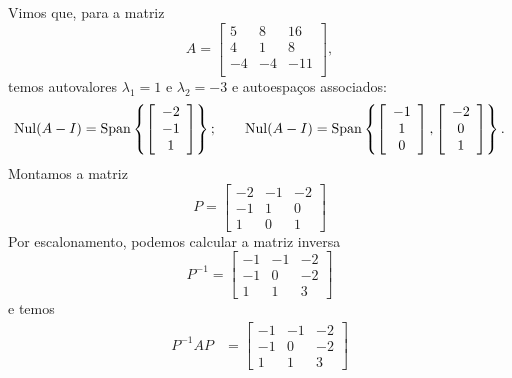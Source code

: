 \begin{ex}\label{exp:3x3denovo}
	Vimos que, para a matriz
	\begin{equation}
	A =
	\left[
	\begin{array}{ccc}
	5 & 8 & 16 \\
	4 & 1 & 8 \\
	-4 & -4 & -11 \\
	\end{array}
	\right],
	\end{equation} temos autovalores $\lambda_1 = 1$ e $\lambda_2 = -3$ e autoespaços associados:
	\begin{equation}
	\operatorname{Nul} (A - I) = \operatorname{Span} \left\{ \left[
	\begin{array}{c}
	-2 \\
	-1 \\
	1 \\
	\end{array}
	\right] \right\}; \qquad \operatorname{Nul} (A - I) = \operatorname{Span} \left\{ \left[
	\begin{array}{c}
	-1 \\
	1 \\
	0 \\
	\end{array}
	\right], \left[
	\begin{array}{ccc}
	-2 \\
	0 \\
	1 \\
	\end{array}
	\right] \right\}.
	\end{equation} Montamos a matriz
	\begin{equation}
	P =
	\begin{bmatrix}
	-2&-1&-2 \\ -1&1&0 \\ 1&0&1
	\end{bmatrix}
	\end{equation} Por escalonamento, podemos calcular a matriz inversa
	\begin{equation}
	P^{-1} =
	\begin{bmatrix}
	-1&-1&-2 \\ -1&0&-2 \\ 1&1&3
	\end{bmatrix}
	\end{equation} e temos
          \begin{align*}
	P^{-1} A P & =
	\begin{bmatrix}
	-1&-1&-2 \\ -1&0&-2 \\ 1&1&3

\end{bmatrix}
\end{align*}
\end{ex}
